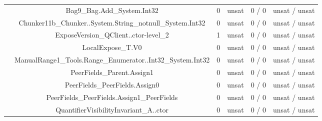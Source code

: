 \begin{table}[htbp]
\begin{minipage}{0.60\textwidth}
{\begin{tabular}[c]{c c!{\vrule width 1.5pt}c|c!{\vrule width 1.5pt}c|c|}
 			& Bag9\_Bag.Add\_System.Int32   	    	     	      & 0    & unsat   & 0  / 0    & unsat / unsat  \\
 			& Chunker11b\_Chunker..System.String\_notnull\_System.Int32   & 0    & unsat   & 0  / 0    & unsat / unsat  \\
 			& ExposeVersion\_QClient..ctor-level\_2   	    	      & 1    & unsat   & 0  / 0    & unsat / unsat  \\
 			& LocalExpose\_T.V0   	    	     			      & 0    & unsat   & 0  / 0    & unsat / unsat  \\
 			& ManualRange1\_Tools.Range\_Enumerator..Int32\_System.Int32  & 0    & unsat   & 0  / 0    & unsat / unsat  \\
 			& PeerFields\_Parent.Assign1   	    	      		      & 0    & unsat   & 0  / 0    & unsat / unsat  \\
 			& PeerFields\_PeerFields.Assign0   	    	     	      & 0    & unsat   & 0  / 0    & unsat / unsat  \\
 			& PeerFields\_PeerFields.Assign1\_PeerFields   	    	      & 0    & unsat   & 0  / 0    & unsat / unsat  \\
 			& QuantifierVisibilityInvariant\_A..ctor   	    	      & 0    & unsat   & 0  / 0    & unsat / unsat  \\

\end{tabular}}
\end{minipage}
\end{table}

